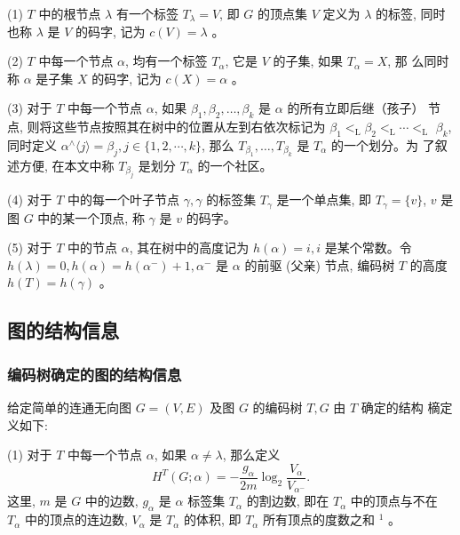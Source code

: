 \documentclass[a4paper]{apa6}
\begin{document}
(1) \(T\) 中的根节点 \(\lambda\) 有一个标签 \(T_{\lambda}=V\), 即 \(G\) 的顶点集 \(V\) 定义为 \(\lambda\) 的标签, 同时也称 \(\lambda\) 是 \(V\) 的码字, 记为 \(c(V)=\lambda\) 。

(2) \(T\) 中每一个节点 \(\alpha\), 均有一个标签 \(T_{\alpha}\), 它是 \(V\) 的子集, 如果 \(T_{\alpha}=X\), 那 么同时称 \(\alpha\) 是子集 \(X\) 的码字, 记为 \(c(X)=\alpha\) 。

(3) 对于 \(T\) 中每一个节点 \(\alpha\), 如果 \(\beta_{1}, \beta_{2}, \ldots, \beta_{k}\) 是 \(\alpha\) 的所有立即后继（孩子） 节点, 则将这些节点按照其在树中的位置从左到右依次标记为 \(\beta_{1}<_{\mathrm{L}} \beta_{2}<_{\mathrm{L}} \cdots<_{\mathrm{L}}\) \(\beta_{k}\), 同时定义 \(\alpha^{\wedge}\langle j\rangle=\beta_{j}, j \in\{1,2, \cdots, k\}\), 那么 \(T_{\beta_{1}}, \ldots, T_{\beta_{k}}\) 是 \(T_{\alpha}\) 的一个划分。为 了叙述方便, 在本文中称 \(T_{\beta_{j}}\) 是划分 \(T_{\alpha}\) 的一个社区。

(4) 对于 \(T\) 中的每一个叶子节点 \(\gamma, \gamma\) 的标签集 \(T_{\gamma}\) 是一个单点集, 即 \(T_{\gamma}=\{v\}\), \(v\) 是图 \(G\) 中的某一个顶点, 称 \(\gamma\) 是 \(v\) 的码字。

(5) 对于 \(T\) 中的节点 \(\alpha\), 其在树中的高度记为 \(h(\alpha)=i, i\) 是某个常数。令 \(h(\lambda)=0, h(\alpha)=h\left(\alpha^{-}\right)+1, \alpha^{-}\) 是 \(\alpha\) 的前驱 (父亲) 节点, 编码树 \(T\) 的高度 \(h(T)=h(\gamma)\) 。

\subsection{图的结构信息}
\label{sec:org8b3c71e}
\subsubsection{编码树确定的图的结构信息}
\label{sec:org4762edd}
给定简单的连通无向图 \(G=(V, E)\) 及图 \(G\) 的编码树 \(T, G\) 由 \(T\) 确定的结构 樀定义如下:

(1) 对于 \(T\) 中每一个节点 \(\alpha\), 如果 \(\alpha \neq \lambda\), 那么定义
$$
H^{T}(G ; \alpha)=-\frac{g_{\alpha}}{2 m} \log _{2} \frac{V_{\alpha}}{V_{\alpha^{-}}} .
$$
这里, \(m\) 是 \(G\) 中的边数, \(g_{\alpha}\) 是 \(\alpha\) 标签集 \(T_{\alpha}\) 的割边数, 即在 \(T_{\alpha}\) 中的顶点与不在 \(T_{\alpha}\) 中的顶点的连边数, \(V_{\alpha}\) 是 \(T_{\alpha}\) 的体积, 即 \(T_{\alpha}\) 所有顶点的度数之和 \({ }^{1}\) 。
\end{document}
